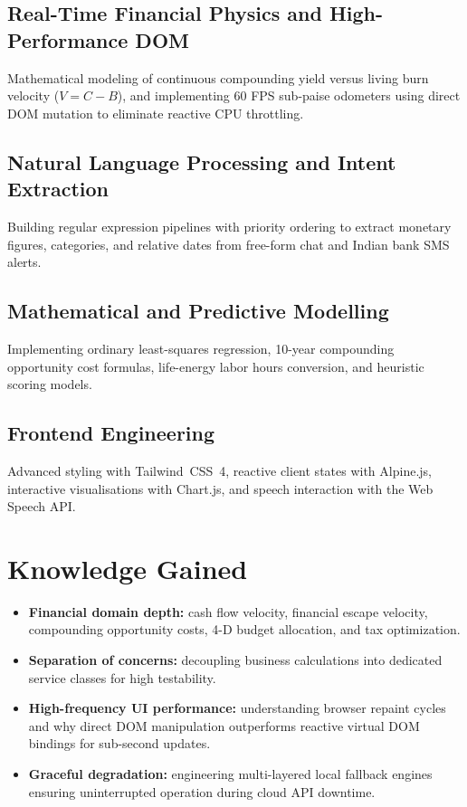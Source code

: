 \documentclass[12pt,a4paper]{report}
\newcommand{\TW}{Tailwind~CSS~4}
\begin{document}
\subsection{Real-Time Financial Physics and High-Performance DOM}
Mathematical modeling of continuous compounding yield versus living burn velocity ($V = C - B$), and implementing 60 FPS sub-paise odometers using direct DOM mutation to eliminate reactive CPU throttling.

\subsection{Natural Language Processing and Intent Extraction}
Building regular expression pipelines with priority ordering to extract monetary figures, categories, and relative dates from free-form chat and Indian bank SMS alerts.

\subsection{Mathematical and Predictive Modelling}
Implementing ordinary least-squares regression, 10-year compounding opportunity cost formulas, life-energy labor hours conversion, and heuristic scoring models.

\subsection{Frontend Engineering}
Advanced styling with \TW{}, reactive client states with Alpine.js, interactive visualisations with Chart.js, and speech interaction with the Web Speech API.


\section{Knowledge Gained}\label{s52}

\begin{itemize}[leftmargin=*]
    \item \textbf{Financial domain depth:} cash flow velocity, financial escape velocity, compounding opportunity costs, 4-D budget allocation, and tax optimization.
    \item \textbf{Separation of concerns:} decoupling business calculations into dedicated service classes for high testability.
    \item \textbf{High-frequency UI performance:} understanding browser repaint cycles and why direct DOM manipulation outperforms reactive virtual DOM bindings for sub-second updates.
    \item \textbf{Graceful degradation:} engineering multi-layered local fallback engines ensuring uninterrupted operation during cloud API downtime.
\end{itemize}
\end{document}
